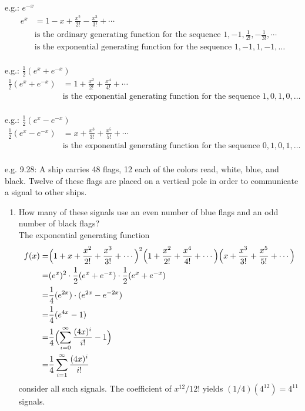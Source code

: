 \documentclass[a4paper]{article}
\begin{document}
\color{red}e.g.: \color{black} $e^{-x}$
\begin{align*}
e^x&=1-x+\frac{x^2}{2!}-\frac{x^3}{3!}+\cdots\\
&\text{is the ordinary generating function for the sequence }1,-1,\frac{1}{2!},-\frac{1}{3!},\cdots\\
&\text{is the exponential generating function for the sequence }1,-1,1,-1,\dots\\
\end{align*}

\color{red}e.g.: \color{black} $\frac{1}{2}(e^x+e^{-x})$
\begin{align*}
\frac{1}{2}(e^x+e^{-x})&=1+\frac{x^2}{2!}+\frac{x^4}{4!}+\cdots\\
&\text{is the exponential generating function for the sequence }1,0,1,0,\dots\\
\end{align*}

\color{red}e.g.: \color{black} $\frac{1}{2}(e^x-e^{-x})$
\begin{align*}
\frac{1}{2}(e^x-e^{-x})&=x+\frac{x^3}{3!}+\frac{x^5}{5!}+\cdots\\
&\text{is the exponential generating function for the sequence }0,1,0,1,\dots\\
\end{align*}

\color{red}e.g. 9.28: \color{black} A ship carries 48 flags, 12 each of the colors read, white, blue, and black. Twelve of these flags are placed on a vertical pole in order to communicate a signal to other ships.
\begin{enumerate}[label=(\alph*)]
\item How many of these signals use an even number of blue flags and an odd number of black flags?\\
The exponential generating function
\begin{align*}
f(x)=&\Bigl(1+x+\frac{x^2}{2!}+\frac{x^3}{3!}+\cdots\Bigr)^2\Bigl(1+\frac{x^2}{2!}+\frac{x^4}{4!}+\cdots\Bigr)\Bigl(x+\frac{x^3}{3!}+\frac{x^5}{5!}+\cdots\Bigr)\\
=&(e^x)^2\cdot\frac{1}{2}(e^x+e^{-x})\cdot\frac{1}{2}(e^x+e^{-x})\\
=&\frac{1}{4}(e^{2x})\cdot(e^{2x}-e^{-2x})\\
=&\frac{1}{4}(e^{4x}-1)\\
=&\frac{1}{4}\Bigl(\sum_{i=0}^{\infty}{\frac{(4x)^i}{i!}}-1\Bigr)\\
=&\frac{1}{4}\sum_{i=1}^{\infty}{\frac{(4x)^i}{i!}}\\
\end{align*}
consider all such signals. The coefficient of ${x^{12}}/{12!}$ yields $(1/4)(4^{12})=4^{11}$ signals.
\end{enumerate}
\end{document}
